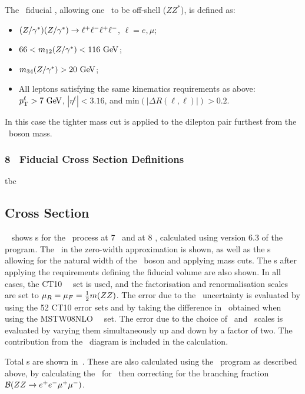 The \ZZsllll\ fiducial \cx , allowing one \Z\ to be off-shell ($ZZ^*$), is defined as:

\begin{itemize}
\item $(Z/\gamma^*)(Z/\gamma^*)\rightarrow\ell^+ \ell^-\ell^+ \ell^-$, $\ell = e,\mu$;
\item $66 < m_{12}(\Z/\gamma^*) <  116\GeV$;
\item $m_{34}(\Z/\gamma^*) > 20\GeV$;
\item All leptons satisfying the same kinematics requirements as above:
$\pT^{\ell} > 7\GeV$,
$|\eta^{\ell}| < 3.16$,
and $\mathrm{min}(|\Delta R(\ell,\ell)|) > 0.2$.
\end{itemize}

In this case the tighter mass cut is applied to the dilepton pair furthest from the \Z\
boson mass.

\subsubsection{8 \tev\ Fiducial Cross Section Definitions}

tbc

\subsection{Cross Section}

~ shows \cx s for the \ZZeemm\ process at 7 \tev\ and
at 8 \tev, calculated using version 6.3 of the
\mcfm~\cite{Campbell:2011} program. The \cx\  in the zero-width approximation is shown, as
well as the \cx s allowing for the natural width of the \Z\ boson and
applying mass cuts.  The \cx s after applying the requirements defining
the fiducial volume are also shown. 
In all cases, the CT10~\cite{CT10} \partDF\ set is used, and the factorisation and renormalisation scales are set
to $\mu_{R} = \mu_{F} = \frac{1}{2} m(ZZ)$. The error due to the \partDF\ 
uncertainty is
evaluated by using the 52 CT10 error sets and by taking the difference in \cx\ 
obtained when using the MSTW08NLO~\cite{bib:MSTW2008} \partDF\ set. The error 
due to the choice of
\fact\ and \renorm\ scales is evaluated by varying them
simultaneously up and down by a factor of two. The contribution from the
\gammas\ diagram is included in the calculation.

Total \cx s are shown in~\tab{cx-total-mcfm}. These are also
calculated using the \mcfm\ program as described above, by
calculating the \cx\  for \ZZeemm\ then correcting for the branching
fraction $\mathcal{B}(ZZ\rightarrow e^{+}e^{-}\mu^{+}\mu^{-})$. 

